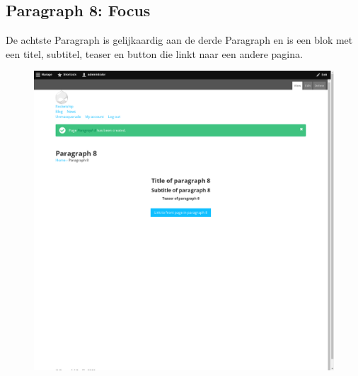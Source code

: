 \subsection{Paragraph 8: Focus}
De achtste Paragraph is gelijkaardig aan de derde Paragraph en is een blok met een titel, subtitel, teaser en button die linkt naar een andere pagina.
\begin{figure}[h]
\includegraphics[width=1\textwidth]{img/p008.png}
\end{figure}

\clearpage
